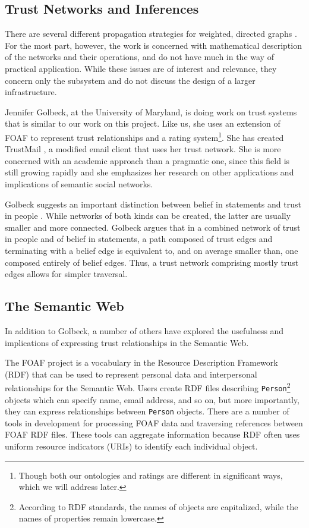 \documentclass[letterpaper]{www2006-submission}
\begin{document}
\subsection{Trust Networks and Inferences}
There are several different propagation strategies for weighted, directed graphs \citep{richardson03management} \citep{abdul-rahman:relying} \citep{guha04propagation}.  For the most part, however, the work is concerned with mathematical description of the networks and their operations, and do not have much in the way of practical application.  While these issues are of interest and relevance, they concern only the subsystem and do not discuss the design of a larger infrastructure.

Jennifer Golbeck, at the University of Maryland, is doing work on trust systems  \citep{golbeckDissertation} that is similar to our work on this project.  Like us, she uses an extension of FOAF to represent trust relationships and a rating system\footnote{Though both our ontologies and ratings are different in significant ways, which we will address later.}.  She has created TrustMail  \citep{trustMail}, a modified email client that uses her trust network.  She is more concerned with an academic approach than a pragmatic one, since this field is still growing rapidly and she emphasizes her research on other applications and implications of semantic social networks.

Golbeck suggests an important distinction between belief in statements and trust in people \citep{golbeck:accuracy}.  While networks of both kinds can be created, the latter are usually smaller and more connected.  Golbeck argues that in a combined network of trust in people and of belief in statements, a path composed of trust edges and terminating with a belief edge is equivalent to, and on average smaller than, one composed entirely of belief edges.  Thus, a trust network comprising mostly trust edges allows for simpler traversal.

\subsection{The Semantic Web}
In addition to Golbeck, a number of others have explored the usefulness and implications of expressing trust relationships in the Semantic Web.

\label{foaf}
The FOAF project \citep{foafProject} is a vocabulary in the Resource Description Framework (RDF) that can be used to represent personal data and interpersonal relationships for the Semantic Web.  Users create RDF files describing \texttt{Person}\footnote{According to RDF standards, the names of objects are capitalized, while the names of properties remain lowercase.} objects which can specify name, email address, and so on, but more importantly, they can express relationships between \texttt{Person} objects.  There are a number of tools in development for processing FOAF data and traversing references between FOAF RDF files.  These tools can aggregate information because RDF often uses uniform resource indicators (URIs) to identify each individual object.
\end{document}
